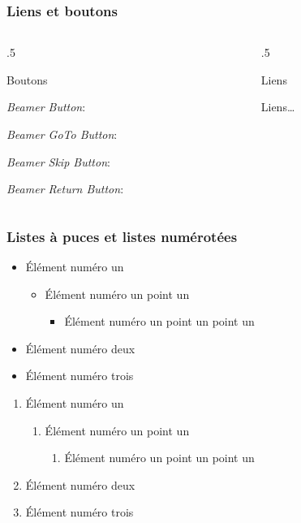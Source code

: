 \documentclass[aspectratio=1610,compress,t,english,french]{hecppt}
\newenvironment{HECcomparaison}[1]{%
	\begin{column}[t]{.5\textwidth}
		\vspace{-7mm}		
		\begin{block}{#1}
}{%
		\end{block}
	\end{column}
}
\begin{document}
\begin{frame}
\frametitle{Liens et boutons}
	\begin{columns}
		\begin{HECcomparaison}{Boutons}
			\emph{Beamer Button}:\\			
			\hyperlink{paletteCouleurs}{}
			
			\emph{Beamer GoTo Button}:\\
			\hyperlink{structureDiapos}{}
			
			\emph{Beamer Skip Button}:\\
			\hyperlink{elementsInterface}{}
			
			\emph{Beamer Return Button}:\\
			\hyperlink{tdm}{}
		\end{HECcomparaison}
		\begin{HECcomparaison}{Liens}
			Liens\ldots
		\end{HECcomparaison}
	\end{columns}

\end{frame}

\begin{frame}
\frametitle{Listes à puces et listes numérotées}
	
	\begin{itemize}
		\item Élément numéro un
			\begin{itemize}
				\item Élément numéro un point un
					\begin{itemize}
						\item Élément numéro un point un point un
					\end{itemize}
			\end{itemize}
		\item Élément numéro deux
		\item Élément numéro trois
	\end{itemize}

	\begin{enumerate}
		\item Élément numéro un
		\begin{enumerate}
			\item Élément numéro un point un
			\begin{enumerate}
				\item Élément numéro un point un point un
			\end{enumerate}
		\end{enumerate}
		\item Élément numéro deux
		\item Élément numéro trois
	\end{enumerate}

\end{frame}
\end{document}
